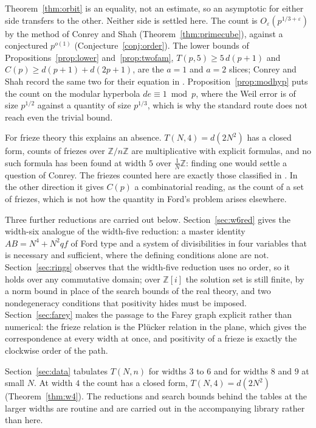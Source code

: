 \documentclass[11pt]{article}
\theoremstyle{plain}
\theoremstyle{definition}
\newcommand{\Z}{\mathbb{Z}}
\newcommand{\lat}{\tfrac{1}{N}\Z}
\begin{document}
Theorem~\ref{thm:orbit} is an equality, not an estimate, so an asymptotic for either side
transfers to the other. Neither side is settled here. The count is
$O_\varepsilon(p^{1/3+\varepsilon})$ by the method of Conrey and Shah \cite{ConreyShah}
(Theorem~\ref{thm:primecube}), against a conjectured $p^{o(1)}$
(Conjecture~\ref{conj:order}). The lower bounds of Propositions~\ref{prop:lower}
and~\ref{prop:twofam}, $T(p,5)\ge5\,d(p+1)$ and $C(p)\ge d(p+1)+d(2p+1)$, are the $a=1$ and
$a=2$ slices; Conrey and Shah record the same two for their equation in
\cite[\S2.1]{ConreyShah}. Proposition~\ref{prop:modhyp} puts the count on the modular
hyperbola $de\equiv1\bmod p$, where the Weil error is of size $p^{1/2}$ against a quantity
of size $p^{1/3}$, which is why the standard route does not reach even the trivial bound.

For frieze theory this explains an absence. $T(N,4)=d(2N^2)$ has a closed form, counts of
friezes over $\Z/n\Z$ are multiplicative with explicit formulas, and no such formula has
been found at width $5$ over $\lat$: finding one would settle a question of Conrey.
The friezes counted here are exactly those classified in \cite{KSSZ}. In the other direction it gives $C(p)$ a combinatorial reading, as the
count of a set of friezes, which is not how the quantity in Ford's problem arises
elsewhere.

Three further reductions are carried out below. Section~\ref{sec:w6red} gives the width-six
analogue of the width-five reduction: a master identity $AB=N^4+N^2qf$ of Ford type and a
system of divisibilities in four variables that is necessary and sufficient, where the
defining conditions alone are not. Section~\ref{sec:rings} observes that the width-five
reduction uses no order, so it holds over any commutative domain; over $\Z[i]$ the solution
set is still finite, by a norm bound in place of the search bounds of the real theory, and
two nondegeneracy conditions that positivity hides must be imposed. Section~\ref{sec:farey}
makes the passage to the Farey graph explicit rather than numerical: the frieze relation is
the Pl\"ucker relation in the plane, which gives the correspondence at every width at once,
and positivity of a frieze is exactly the clockwise order of the path.

Section~\ref{sec:data} tabulates $T(N,n)$ for widths $3$ to $6$ and for widths $8$ and $9$
at small $N$. At width $4$ the count has a closed form,
$T(N,4)=d(2N^2)$ (Theorem~\ref{thm:w4}). The reductions and search bounds behind the tables
at the larger widths are routine and are carried out in the accompanying library rather than
here.
\end{document}
